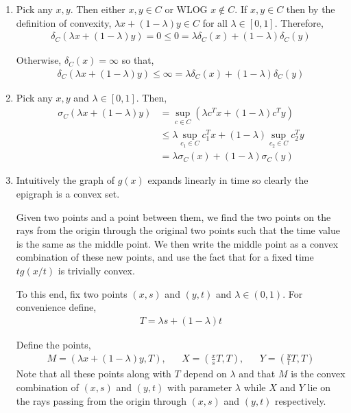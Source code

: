 \documentclass[10pt]{article}
\begin{document}
\begin{solution}[Solution]
\begin{enumerate}[label=(\alph*)]
    \item Pick any \( x,y \). Then either \( x,y \in C \) or WLOG \( x\notin C \).
        If \( x,y\in C \) then by the definition of convexity, \( \lambda x + (1-\lambda)y\in C \) for all \( \lambda\in[0,1] \). Therefore,
        \begin{align*}
            \delta_C( \lambda x + (1-\lambda)y) = 0 \leq 0 = \lambda \delta_C(x) + (1-\lambda) \delta_C(y)
        \end{align*}
        
        Otherwise, \( \delta_C(x) = \infty \) so that,
        \begin{align*}
            \delta_C( \lambda x + (1-\lambda)y) \leq \infty = \lambda \delta_C(x) + (1-\lambda) \delta_C(y)
        \end{align*}

    \item Pick any \( x,y \) and \( \lambda \in [0,1] \). Then, 
        \begin{align*}
            \sigma_C( \lambda x + (1-\lambda)y)
            &= \sup_{c\in C} \left( \lambda c^Tx + (1-\lambda)c^Ty \right)
            \\&\leq  \lambda \sup_{c_1\in C} c_1^Tx + (1-\lambda) \sup_{c_2\in C} c_2^Ty
            \\&= \lambda \sigma_C(x) + (1-\lambda) \sigma_C(y)
        \end{align*}
        
        
    \item
        Intuitively the graph of \( g(x) \) expands linearly in time so clearly the epigraph is a convex set.

        Given two points and a point between them, we find the two points on the rays from the origin through the original two points such that the time value is the same as the middle point. We then write the middle point as a convex combination of these new points, and use the fact that for a fixed time \( tg(x/t) \) is trivially convex.

        To this end, fix two points \( (x,s) \) and \( (y,t) \) and \( \lambda\in(0,1) \). For convenience define,
        \begin{align*}
            T = \lambda s + (1-\lambda) t
        \end{align*}
        
        Define the points,
        \begin{align*}
            M = ( \lambda x + (1-\lambda) y, T)
            ,&&X = \left( \frac{x}{s} T,T \right)
            ,&&Y = \left( \frac{y}{t} T,T \right)
        \end{align*}
        Note that all these points along with \( T \) depend on \( \lambda \) and that \( M \) is the convex combination of \( (x,s) \) and \( (y,t) \) with parameter \( \lambda \) while \( X \) and \( Y \) lie on the rays passing from the origin through \( (x,s) \) and \( (y,t) \) respectively.


\end{enumerate}
\end{solution}
\end{document}
